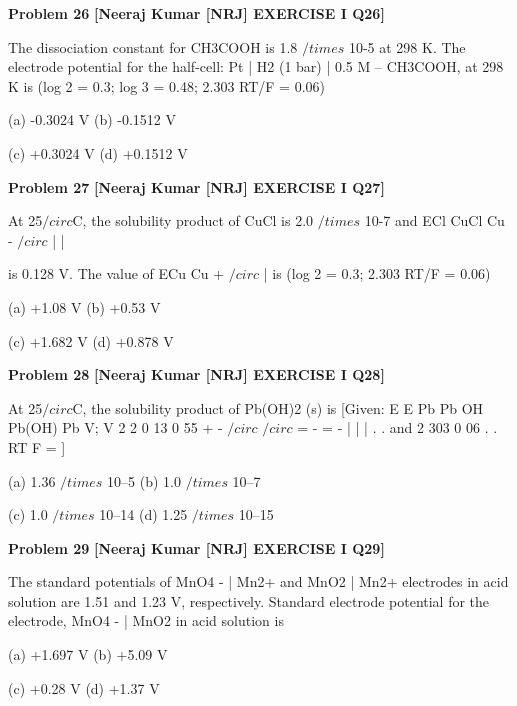 \begin{problembox}
\textbf{Problem 26} \hfill \textbf{[Neeraj Kumar [NRJ] EXERCISE I Q26]}
\label{q:ext-nrj_all_questions-26}

The dissociation constant for CH3COOH is 1.8 
$/times$ 10-5 at 298 K. The electrode potential for the 
half-cell: Pt | H2 (1  bar) | 0.5  M -- CH3COOH, 
at 298 K is (log 2 = 0.3; log 3 = 0.48; 2.303 RT/F 
= 0.06)
 
 (a) -0.3024 V 
(b) -0.1512 V
 
 (c) +0.3024 V 
(d) +0.1512 V
\end{problembox}

\begin{problembox}
\textbf{Problem 27} \hfill \textbf{[Neeraj Kumar [NRJ] EXERCISE I Q27]}
\label{q:ext-nrj_all_questions-27}

At 25$/circ$C, the solubility product of CuCl is 2.0 
$/times$ 10-7 and ECl  CuCl  Cu
-
$/circ$
|
|
 
is 0.128 V. The value of 
ECu
Cu
+
$/circ$
|
 is (log 2 = 0.3; 2.303 RT/F =  0.06)
 
 (a) +1.08 V 
(b) +0.53 V
 
 (c) +1.682 V 
(d) +0.878 V
\end{problembox}

\begin{problembox}
\textbf{Problem 28} \hfill \textbf{[Neeraj Kumar [NRJ] EXERCISE I Q28]}
\label{q:ext-nrj_all_questions-28}

At 25$/circ$C, the solubility product of Pb(OH)2 (s) is 
[Given: E
E
Pb
Pb
OH
Pb(OH) Pb
V;
V
2
2
0 13
0 55
+
-
$/circ$
$/circ$
= -
= -
|
|
|
.
.
and 2 303
0 06
.
.
RT
F
=
]
 
 (a) 1.36 $/times$ 10--5 
(b) 1.0 $/times$ 10--7
 
 (c) 1.0 $/times$ 10--14 
(d) 1.25 $/times$ 10--15
\end{problembox}

\begin{problembox}
\textbf{Problem 29} \hfill \textbf{[Neeraj Kumar [NRJ] EXERCISE I Q29]}
\label{q:ext-nrj_all_questions-29}

The standard potentials of MnO4
-  |  Mn2+ and 
MnO2  |  Mn2+ electrodes in acid solution are 
1.51 and 1.23 V, respectively. Standard electrode 
potential for the electrode, MnO4
- | MnO2 in acid 
solution is
 
 (a) +1.697 V 
(b) +5.09 V
 
 (c) +0.28 V 
(d) +1.37 V
\end{problembox}


